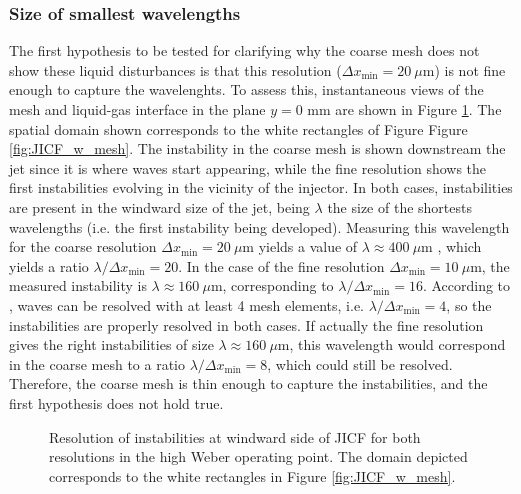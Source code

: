 \clearpage

\subsubsection*{Size of smallest wavelengths}


The first hypothesis to be tested for clarifying why the coarse mesh does not show these liquid disturbances is that this resolution ($\Delta x_\mathrm{min} = 20~\mu$m) is not fine enough to capture the wavelenghts. To assess this, instantaneous views of the mesh and liquid-gas interface in the plane $y = 0$ mm are shown in Figure \ref{fig:JICF_instabilities_lambda}. The spatial domain shown corresponds to the white rectangles of Figure Figure \ref{fig:JICF_w_mesh}. The instability in the coarse mesh is shown downstream the jet since it is where waves start appearing, while the fine resolution shows the first instabilities evolving in the vicinity of the injector. In both cases, instabilities are present in the windward size of the jet, being $\lambda$ the size of the shortests wavelengths (i.e. the first instability being developed). Measuring this wavelength for the coarse resolution $\Delta x_\mathrm{min} = 20~\mu$m yields a value of $\lambda \approx 400 ~ \mu$m , which yields a ratio $\lambda / \Delta x_\mathrm{min} = 20$. In the case of the fine resolution $\Delta x_\mathrm{min} = 10~\mu$m, the measured instability is $\lambda \approx 160 ~ \mu$m, corresponding to $\lambda / \Delta x_\mathrm{min} = 16$.  According to , waves can be resolved with at least 4 mesh elements, i.e.  $\lambda / \Delta x_\mathrm{min} = 4$, so the instabilities are properly resolved in both cases. If actually the fine resolution gives the right instabilities of size $\lambda \approx 160 ~ \mu$m, this wavelength would correspond in the coarse mesh to a ratio $\lambda / \Delta x_\mathrm{min} = 8$, which could still be resolved. Therefore, the coarse mesh is thin enough to capture the instabilities, and the first hypothesis does not hold true.



\begin{figure}[ht]
\centering
{}
\caption[Resolution of instabilities at windward side of JICF for both resolutions in the high Weber operating point.]{Resolution of instabilities at windward side of JICF for both resolutions in the high Weber operating point. The domain depicted corresponds to the white rectangles in Figure \ref{fig:JICF_w_mesh}. }
\label{fig:JICF_instabilities_lambda}
\end{figure}

